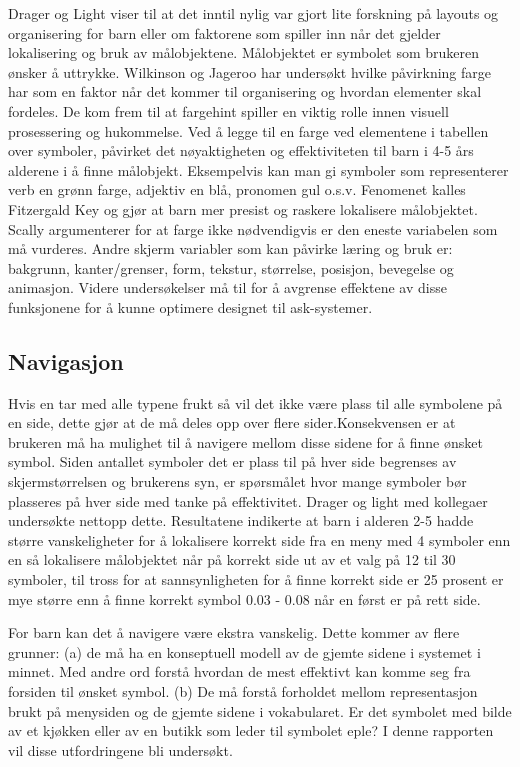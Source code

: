 Drager og Light \cite{aac} viser til at det inntil nylig var gjort lite forskning på layouts og organisering for barn eller om faktorene som spiller inn når det gjelder lokalisering og bruk av målobjektene. Målobjektet er symbolet som brukeren ønsker å uttrykke. Wilkinson og Jageroo \cite{Wilkinson2006} har undersøkt hvilke påvirkning farge har som en faktor når det kommer til organisering og hvordan elementer skal fordeles. De kom frem til at fargehint spiller en viktig rolle innen visuell prosessering  og hukommelse. Ved å legge til en farge ved elementene i tabellen over symboler, påvirket det nøyaktigheten og effektiviteten til barn i 4-5 års alderene i å finne målobjekt. Eksempelvis kan man gi symboler som representerer verb en grønn farge, adjektiv en blå, pronomen gul o.s.v. Fenomenet kalles Fitzergald Key og gjør at barn mer presist og raskere lokalisere målobjektet. Scally \cite{Scally} argumenterer for at farge ikke nødvendigvis er den eneste variabelen som må vurderes. Andre skjerm variabler som kan påvirke læring og bruk er: bakgrunn, kanter/grenser, form, tekstur, størrelse, posisjon, bevegelse og animasjon. Videre undersøkelser må til for å avgrense effektene av disse funksjonene for å kunne optimere designet til ask-systemer.


\subsection{Navigasjon}
\label{subsec:navigasjon}

Hvis en tar med alle typene frukt så vil det ikke være plass til alle symbolene på en side, dette gjør at de må deles opp over flere sider.Konsekvensen er at brukeren må ha mulighet til å navigere mellom disse sidene for å finne ønsket symbol. Siden antallet symboler det er plass til på hver side begrenses av skjermstørrelsen og brukerens syn, er spørsmålet hvor mange symboler bør plasseres på hver side med tanke på effektivitet. Drager og light med kollegaer undersøkte nettopp dette. Resultatene indikerte at barn i alderen 2-5 hadde større vanskeligheter for å lokalisere korrekt side fra en meny med 4 symboler enn en så lokalisere målobjektet når på korrekt side ut av et valg på 12 til 30 symboler, til tross for at sannsynligheten for å finne korrekt side er 25 prosent er mye større enn å finne korrekt symbol 0.03 - 0.08 når en først er på rett side.

For barn kan det å navigere være ekstra vanskelig. Dette kommer av flere grunner: (a) de må ha en konseptuell modell av de gjemte sidene i systemet i minnet. Med andre ord forstå hvordan de mest effektivt kan komme seg fra forsiden til ønsket symbol. (b) De må forstå forholdet mellom representasjon brukt på menysiden og de gjemte sidene i vokabularet. Er det symbolet med bilde av et kjøkken eller av en butikk som leder til symbolet eple? I denne rapporten vil disse utfordringene bli undersøkt.


